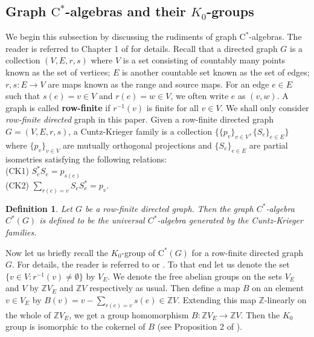 \documentclass[a4paper,11pt,reqno]{amsart}
\theoremstyle{plain}
\newtheorem{defn}[thm]{Definition}
\theoremstyle{named}
\numberwithin{equation}{section}
\begin{document}
            \subsection{Graph $\textrm{C}^{\ast}$-algebras and their $K_{0}$-groups}
            We begin this subsection by discussing the rudiments of graph $\textrm{C}^{*}$-algebras. The reader is referred to Chapter 1 of \cite{raeburn} for details. Recall that a directed graph $G$ is a collection $(V, E, r,s)$ where $V$ is a set consisting of countably many points known as the set of vertices; $E$ is another countable set known as the set of edges; $r,s:E\rightarrow V$ are maps known as the range and source maps. For an edge $e\in E$ such that $s(e)=v\in V$ and $r(e)=w\in V$, we often write $e$ as $(v,w)$. A graph is called {\bf row-finite} if $r^{-1}(v)$ is finite for all $v\in V$. We shall only consider {\it row-finite directed} graph in this paper. Given a row-finite directed graph $G=(V,E,r,s)$, a Cuntz-Krieger family is a collection $\{\{p_{v}\}_{v\in V},\{S_{e}\}_{e\in E}\}$ where $\{p_{v}\}_{v\in V}$ are mutually orthogonal projections and $\{S_{e}\}_{e\in E}$ are partial isometries satisfying the following relations:\vspace{0.1in}\\
            (CK1) $S_{e}^{\ast}S_{e}=p_{s(e)}$\\
            (CK2) $\sum_{r(e)=v}{S_{e}S_{e}^{\ast}}=p_{v}$.
            \begin{defn}
                Let $G$ be a row-finite directed graph. Then the graph $C^{\ast}$-algebra $C^{\ast}(G)$ is defined to be the universal $C^{\ast}$-algebra generated by the Cuntz-Krieger families.
            \end{defn}
           Now let us briefly recall the $K_{0}$-group of $\textrm{C}^{\ast}(G)$ for a row-finite directed graph $G$. For details, the reader is referred to \cite{szymanski} or \cite{raeburn}. To that end let us denote the set $\{v\in V: r^{-1}(v)\neq\emptyset\}$ by $V_{E}$. We denote the free abelian groups on the sets $V_{E}$ and $V$ by $\mathbb{Z}V_{E}$ and $\mathbb{Z}V$ respectively as usual. Then define a map $B$ on an element $v\in V_{E}$ by $B(v)=v-\sum_{r(e)=v}s(e)\in\mathbb{Z}V$. Extending this map $\mathbb{Z}$-linearly on the whole of $\mathbb{Z}V_{E}$, we get a group homomorphism $B:\mathbb{Z}V_{E}\rightarrow\mathbb{Z}V$. Then the $K_{0}$ group is isomorphic to the cokernel of $B$ (see Proposition 2 of \cite{szymanski}).
\end{document}

